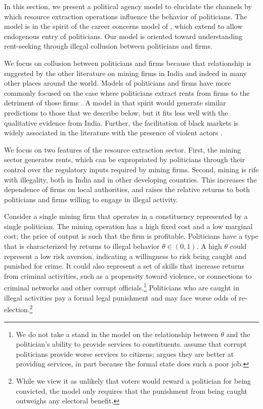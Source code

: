 \doublespacing

In this section, we present a political agency model to elucidate the
channels by which resource extraction operations influence the
behavior of politicians. The model is in the spirit of the career
concerns model of , which
 extend to allow endogenous entry of
politicians. Our model is oriented toward understanding rent-seeking
through illegal collusion between politicians and firms.

We focus on collusion between politicians and firms because that
relationship is suggested by the other literature on mining firms in
India and indeed in many other places around the world. Models of
politicians and firms have more commonly focused on the case where
politicians extract rents from firms to the detriment of those firms
\cite{Shleifer1994}. A model in that spirit would generate similar
predictions to those that we describe below, but it fits less well
with the qualitative evidence from India. Further, the facilitation of
black markets is widely associated in the literature with the presence
of violent actors
\cite{Tilly1985,Gambetta1996,Bandiera2003,Chimeli2011,Skarbek2011}.

We focus on two features of the resource extraction sector. First, the
mining sector generates rents, which can be expropriated by
politicians through their control over the regulatory inputs required
by mining firms. Second, mining is rife with illegality, both in India
and in other developing countries. This increases the dependence of
firms on local authorities, and raises the relative returns to both
politicians and firms willing to engage in illegal activity.
  
Consider a single mining firm that operates in a constituency
represented by a single politician. The mining operation has a high
fixed cost and a low marginal cost; the price of output is such that
the firm is profitable.  Politicians have a type that is characterized
by returns to illegal behavior $\theta \in (0,1)$. A high $\theta$
could represent a low risk aversion, indicating a willingness to risk
being caught and punished for crime. It could also represent a set of
skills that increase returns from criminal activities, such as a
propensity toward violence, or connections to criminal networks and
other corrupt officials.\footnote{We do not take a stand in the model
  on the relationship between $\theta$ and the politician's ability to
  provide services to constituents.  assume
  that corrupt politicians provide worse services to citizens;
   argues they are better at providing
  services, in part because the formal state does such a poor job.}
Politicians who are caught in illegal activities pay a formal legal
punishment and may face worse odds of re-election.\footnote{While we
  view it as unlikely that voters would reward a politician for being
  convicted, the model only requires that the punishment from being
  caught outweighs any electoral benefit.}

